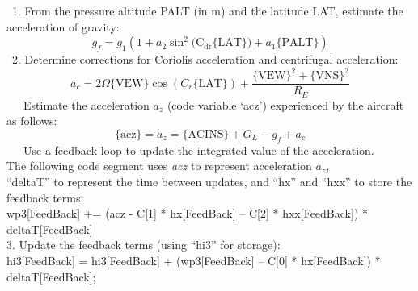 \documentclass[
]{book}
\begin{document}
~1. From the pressure altitude PALT (in m) and the latitude LAT, estimate
the acceleration of gravity:\\
\begin{equation}
g_{f}=g_{1}\left(1+a_{2}\sin^{2}(\mathrm{C_{dr}\{LAT\})}+a_{1}\mathrm{\{PALT\}}\right)
\label{eq:gf}
\end{equation}
~2. Determine corrections for Coriolis acceleration
and centrifugal acceleration:\\
\begin{equation}
a_{c}=2\Omega\mathrm{\{VEW\}}\cos(C_{r}\mathrm{\{LAT\}})+\frac{\mathrm{\{VEW\}}^{2}+\mathrm{\{VNS\}}^{2}}{R_{E}}
\label{eq:ac}
\end{equation}
~~~Estimate the acceleration \(a_{z}\) (code variable `acz') experienced
by the aircraft as follows:\\
\begin{equation}
\mathrm{\{acz\}}=a_{z}=\mathrm{\{ACINS\}}+G_{L}-g_{f}+a_{c}
\label{eq:acz}
\end{equation}
~~~Use a feedback loop to update the integrated value of the acceleration.\\
\hspace*{0.333em}\hspace*{0.333em}\hspace*{0.333em}The following code segment uses \emph{acz} to represent acceleration \(a_{z}\),\\
\hspace*{0.333em}\hspace*{0.333em}\hspace*{0.333em}``deltaT'' to represent the time between updates, and ``hx'' and ``hxx''
to store the feedback terms:\\
\hspace*{0.333em}\hspace*{0.333em}\hspace*{0.333em}\hspace*{0.333em}\hspace*{0.333em}wp3{[}FeedBack{]} += (acz - C{[}1{]} * hx{[}FeedBack{]} -- C{[}2{]} * hxx{[}FeedBack{]}) * deltaT{[}FeedBack{]}\\
\hspace*{0.333em}3. Update the feedback terms (using ``hi3'' for storage):\\
\hspace*{0.333em}\hspace*{0.333em}\hspace*{0.333em}\hspace*{0.333em}\hspace*{0.333em}hi3{[}FeedBack{]} = hi3{[}FeedBack{]} + (wp3{[}FeedBack{]} -- C{[}0{]} * hx{[}FeedBack{]}) * deltaT{[}FeedBack{]};\\
\end{document}
